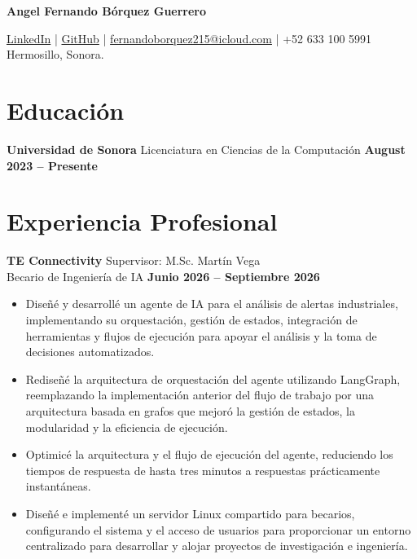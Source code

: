 \documentclass[11pt]{article}
\begin{document}
{\Huge \textbf{Angel Fernando Bórquez Guerrero}} \\
\vspace{-0.4cm}
\par \href{https://www.linkedin.com/in/fernandoborquez/}{LinkedIn} \quad | \quad
\href{https://github.com/FernyBoy}{GitHub} \quad | \quad
\href{mailto:fernandoborquez215@icloud.com}{fernandoborquez215@icloud.com} \quad | \quad
+52 633 100 5991 \\
Hermosillo, Sonora.





\section*{Educación}
\textbf{Universidad de Sonora}
Licenciatura en Ciencias de la Computación \hfill \textbf{August 2023 -- Presente}



\section*{Experiencia Profesional}
\textbf{TE Connectivity} \hfill Supervisor: M.Sc. Martín Vega \\
Becario de Ingeniería de IA \hfill \textbf{Junio 2026 -- Septiembre 2026}
\vspace{-0.3cm}
\begin{itemize}[leftmargin=*]
    \item Diseñé y desarrollé un agente de IA para el análisis de alertas industriales, implementando su orquestación, gestión de estados, integración de herramientas y flujos de ejecución para apoyar el análisis y la toma de decisiones automatizados.

    \vspace{-0.3cm}
    \item Rediseñé la arquitectura de orquestación del agente utilizando LangGraph, reemplazando la implementación anterior del flujo de trabajo por una arquitectura basada en grafos que mejoró la gestión de estados, la modularidad y la eficiencia de ejecución.

    \vspace{-0.3cm}
    \item Optimicé la arquitectura y el flujo de ejecución del agente, reduciendo los tiempos de respuesta de hasta tres minutos a respuestas prácticamente instantáneas.

    \vspace{-0.3cm}
    \item Diseñé e implementé un servidor Linux compartido para becarios, configurando el sistema y el acceso de usuarios para proporcionar un entorno centralizado para desarrollar y alojar proyectos de investigación e ingeniería.
\end{itemize}
\end{document}

